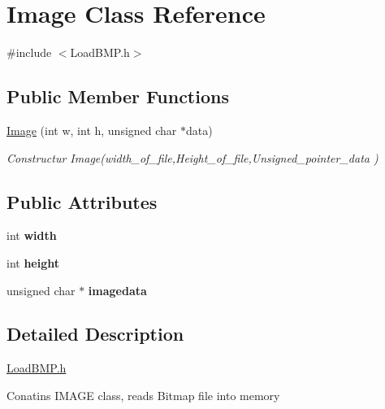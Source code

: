 \hypertarget{classImage}{\section{\-Image \-Class \-Reference}
\label{classImage}
}


{\ttfamily \#include $<$\-Load\-B\-M\-P.\-h$>$}

\subsection*{\-Public \-Member \-Functions}
\begin{DoxyCompactItemize}
\item 
\hyperlink{classImage_a264d2fc87171fc29d50ed2ac1f2a695d}{\-Image} (int w, int h, unsigned char $\ast$data)
\begin{DoxyCompactList}\small\item\em \-Constructur \-Image(width\-\_\-of\-\_\-file,\-Height\-\_\-of\-\_\-file,\-Unsigned\-\_\-pointer\-\_\-data ) \end{DoxyCompactList}\end{DoxyCompactItemize}
\subsection*{\-Public \-Attributes}
\begin{DoxyCompactItemize}
\item 
\hypertarget{classImage_ab8d12f635013c04159cd4d3d972bac88}{int {\bfseries width}}\label{classImage_ab8d12f635013c04159cd4d3d972bac88}

\item 
\hypertarget{classImage_a51df43db420c9c0b57536cb2dd36de5c}{int {\bfseries height}}\label{classImage_a51df43db420c9c0b57536cb2dd36de5c}

\item 
\hypertarget{classImage_a5161f4b4c8540496607adc56a0b0f917}{unsigned char $\ast$ {\bfseries imagedata}}\label{classImage_a5161f4b4c8540496607adc56a0b0f917}

\end{DoxyCompactItemize}


\subsection{\-Detailed \-Description}
\hyperlink{LoadBMP_8h_source}{\-Load\-B\-M\-P.\-h}

\-Conatins \-I\-M\-A\-G\-E class, reads \-Bitmap file into memory

